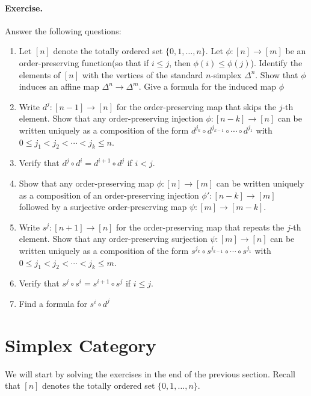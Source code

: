 \documentclass[11pt]{article}
\theoremstyle{definition}
\theoremstyle{plain}
\begin{document}
\paragraph{Exercise.} Answer the following questions:
\begin{enumerate}[label=(\alph*)]
    \item Let $[n] $ denote the totally ordered set $\{0, 1, \ldots, n\}$. Let $\phi : [n] \to [m]$ be an order-preserving function(so that if $i \leq j$, then
          $\phi(i) \leq \phi(j)$). Identify the elements of $[n] $ with the vertices of
          the standard $n$-simplex $\Delta^n$. Show that $\phi$ induces an affine map $\Delta^n \to \Delta^m$. Give a formula for the induced map $\phi$
    \item Write $d^j : [n-1] \to [n] $ for the order-preserving map that skips the $j$-th element. Show that any order-preserving injection $\phi : [n-k] \to [n]$ can be written uniquely as a composition of the form $d^{j_k} \circ d^{j_{k-1}} \circ \cdots \circ d^{j_1}$ with $ 0 \leq j_1 < j_2 < \cdots < j_k \leq n$.
    \item Verify that $d^j \circ d^i = d^{i+1} \circ d^j$ if $i < j$.
    \item Show that any order-preserving map $\phi : [n] \to [m]$ can be written uniquely as a composition of an order-preserving injection $\phi' : [n-k] \to [m]$ followed by a surjective order-preserving map $\psi : [m] \to [m-k]$.
    \item Write $s^j : [n+1] \to [n]$ for the order-preserving map that repeats the $j$-th element. Show that any order-preserving surjection $\psi : [m] \to [n]$ can be written uniquely as a composition of the form $s^{j_k} \circ s^{j_{k-1}} \circ \cdots \circ s^{j_1}$ with $ 0 \leq j_1 < j_2 < \cdots < j_k \leq m$.
    \item Verify that $s^j \circ s^i = s^{i+1} \circ s^j$ if $i \leq j$.
    \item Find a formula for $s^i \circ d^j $
\end{enumerate}






\section{Simplex Category}





We will start by solving the exercises in  the end of the previous section.
Recall that $[n]$ denotes the totally ordered set $\{0, 1, \ldots, n\}$.
\end{document}
